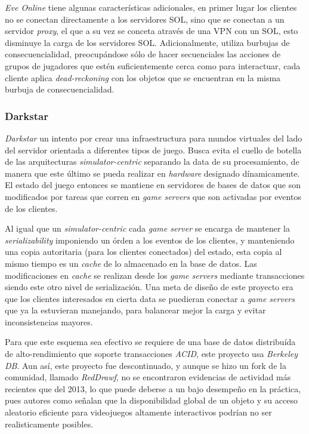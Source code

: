 \emph{Eve Online} tiene algunas características adicionales, en primer lugar los clientes no se conectan directamente a los servidores SOL, sino que se conectan a un servidor \emph{proxy}, el que a su vez se conceta através de una VPN con un SOL, esto disminuye la carga de los servidores SOL. Adicionalmente, utiliza burbujas de consecuencialidad, preocupándose sólo de hacer secuenciales las acciones de grupos de jugadores que estén suficientemente cerca como para interactuar, cada cliente aplica \emph{dead-reckoning} con los objetos que se encuentran en la misma burbuja de consecuencialidad.

\subsubsection{Darkstar}

\emph{Darkstar} un intento por crear una infraestructura para mundos virtuales del lado del servidor orientada a diferentes tipos de juego. Busca evita el cuello de botella de las arquitecturas \emph{simulator-centric} separando la data de su procesamiento, de manera que este último se pueda realizar en \emph{hardware} designado dínamicamente. El estado del juego entonces se mantiene en servidores de bases de datos que son modificados por tareas que corren en \emph{game servers} que son activadas por eventos de los clientes.

Al igual que un \emph{simulator-centric} cada \emph{game server} se encarga de mantener la \emph{serializability} imponiendo un órden a los eventos de los clientes, y manteniendo una copia autoritaria (para los clientes conectados) del estado, esta copia al mismo tiempo es un \emph{cache} de lo almacenado en la base de datos. Las modificaciones en \emph{cache} se realizan desde los \emph{game servers} mediante transacciones siendo este otro nivel de serialización. Una meta de diseño de este proyecto era que los clientes interesados en cierta data se puedieran conectar a \emph{game servers} que ya la estuvieran manejando, para balancear mejor la carga y evitar inconsistencias mayores.

Para que este esquema sea efectivo se requiere de una base de datos distribuída de alto-rendimiento que soporte transacciones \emph{ACID}, este proyecto usa \emph{Berkeley DB}. Aun así, este proyecto fue descontinuado, y aunque se hizo un fork de la comunidad, llamado \emph{RedDrawf}, no se encontraron evidencias de actividad más recientes que del 2013, lo que puede deberse a un bajo desempeño en la práctica, pues autores como \cite{fujita2006new} señalan que la disponibilidad global de un objeto y su acceso aleatorio eficiente para videojuegos altamente interactivos podrían no ser realisticamente posibles.

